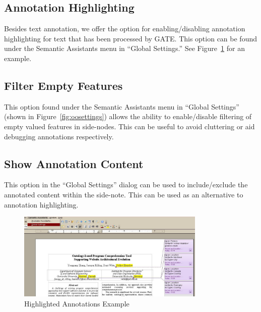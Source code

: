 \subsection{Annotation Highlighting}
Besides text annotation, we offer the option for enabling/disabling annotation
highlighting for text that has been processed by GATE. This option can be
found under the Semantic Assistants menu in ``Global Settings.''  See
Figure~\ref{fig:highlight} for an example.

\subsection{Filter Empty Features}
This option found under the Semantic Assistants menu in ``Global Settings'' (shown
in Figure~\ref{fig:oosettings}) allows the ability to enable/disable filtering of
empty valued features in side-nodes. This can be useful to avoid cluttering or aid
debugging annotations respectively.

\subsection{Show Annotation Content}
This option in the ``Global Settings'' dialog can be used to include/exclude
the annotated content within the side-note. This can be used as an alternative
to annotation highlighting.

\begin{figure}
  \centering
  \includegraphics[width=0.8\textwidth]{pictures/highlighting.jpg}
  \caption{Highlighted Annotations Example}
  \label{fig:highlight}
\end{figure}

